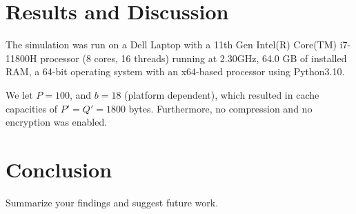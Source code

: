 \documentclass[11pt, journal]{IEEEtran}
\begin{document}
\section{Results and Discussion}
The simulation was run
on a Dell Laptop with a 11th Gen Intel(R) Core(TM) i7-11800H processor (8 cores, 16 threads)
running at 2.30GHz, 64.0 GB of installed RAM,
a 64-bit operating system with an x64-based processor
using Python3.10.

We let $P = 100$, and $b = 18$ (platform dependent),
which resulted in cache
capacities of $P' = Q' = 1800$ bytes.
Furthermore, no compression and no encryption
was enabled.

\section{Conclusion}
Summarize your findings and suggest future work.



\end{document}
